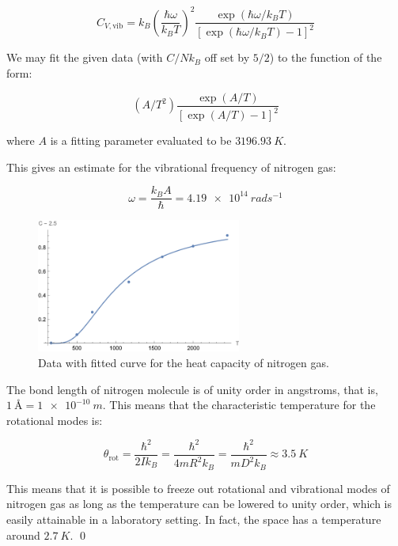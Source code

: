 \documentclass[12pt]{article}
\begin{document}
\begin{equation}
    C_{V,\text{vib}} = k_{B} \left( \frac{\hbar \omega}{k_{B}T} \right)^{2} \frac{\exp\left( \hbar \omega/k_{B}T \right)}{\left[ \exp\left( \hbar \omega/k_{B}T \right) - 1 \right]^{2}}
\end{equation}

We may fit the given data (with $C/Nk_{B}$ off set by $5/2$) to the function of the form:

\begin{equation}
    \left( A/T^{2} \right) \frac{\exp\left( A/T \right)}{\left[ \exp\left( A/T \right) - 1 \right]^{2}}
\end{equation}

where $A$ is a fitting parameter evaluated to be $\qty{3196.93}{K}$.

This gives an estimate for the vibrational frequency of nitrogen gas:

\begin{equation}
    \omega = \frac{k_{B}A}{\hbar} = \qty{4.19e14}{rads^{-1}}
\end{equation}

\begin{figure}[h]
    \centering
    \includegraphics[width=0.6\textwidth]{../plots/statistics_3_2_a.png}
    \caption{Data with fitted curve for the heat capacity of nitrogen gas.}
\end{figure}

The bond length of nitrogen molecule is of unity order in angstroms, that is, $\qty{1}{\angstrom} = \qty{1e-10}{m}$. This means that the characteristic temperature for the rotational modes is:

\begin{equation}
    \theta_{\text{rot}} = \frac{\hbar^{2}}{2I k_{B}} = \frac{\hbar^{2}}{4mR^{2} k_{B}} = \frac{\hbar^{2}}{mD^{2} k_{B}} \approx \qty{3.5}{K}
\end{equation}

This means that it is possible to freeze out rotational and vibrational modes of nitrogen gas as long as the temperature can be lowered to unity order, which is easily attainable in a laboratory setting. In fact, the space has a temperature around $\qty{2.7}{K}$.
\qed
\end{document}
